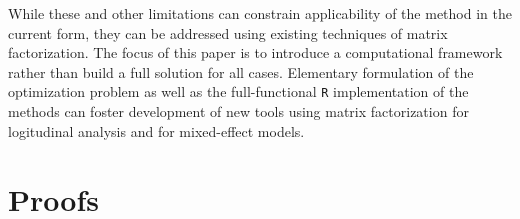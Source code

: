 \documentclass[preprint]{imsart}
\numberwithin{equation}{section}
\theoremstyle{plain}
\begin{document}
While these and other limitations can constrain applicability of the method in the current form, they can be addressed using existing techniques of matrix factorization. The focus of this paper is to introduce a computational framework rather than build a full solution for all cases. Elementary formulation of the optimization problem as well as the full-functional \verb|R| implementation of the methods can foster development of new tools using matrix factorization for logitudinal analysis and for mixed-effect models.



\renewcommand*{\bibfont}{\small}


\appendix

\section{Proofs}\label{s:convergence}
\end{document}
